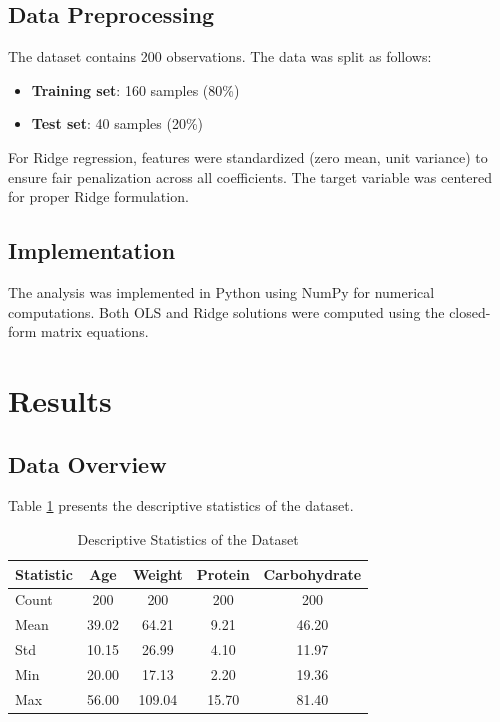 \documentclass{article}
\begin{document}
\subsection{Data Preprocessing}

The dataset contains 200 observations. The data was split as follows:
\begin{itemize}
    \item \textbf{Training set}: 160 samples (80\%)
    \item \textbf{Test set}: 40 samples (20\%)
\end{itemize}

For Ridge regression, features were standardized (zero mean, unit variance) to ensure fair penalization across all coefficients. The target variable was centered for proper Ridge formulation.

\subsection{Implementation}

The analysis was implemented in Python using NumPy for numerical computations. Both OLS and Ridge solutions were computed using the closed-form matrix equations.

\section{Results}

\subsection{Data Overview}

Table \ref{tab:summary_stats} presents the descriptive statistics of the dataset.

\begin{table}[h]
    \centering
    \caption{Descriptive Statistics of the Dataset}
    \label{tab:summary_stats}
    \begin{tabular}{lcccc}
        \toprule
        \textbf{Statistic} & \textbf{Age} & \textbf{Weight} & \textbf{Protein} & \textbf{Carbohydrate} \\
        \midrule
        Count & 200 & 200 & 200 & 200 \\
        Mean & 39.02 & 64.21 & 9.21 & 46.20 \\
        Std & 10.15 & 26.99 & 4.10 & 11.97 \\
        Min & 20.00 & 17.13 & 2.20 & 19.36 \\
        Max & 56.00 & 109.04 & 15.70 & 81.40 \\
        \bottomrule
    \end{tabular}
\end{table}
\end{document}

